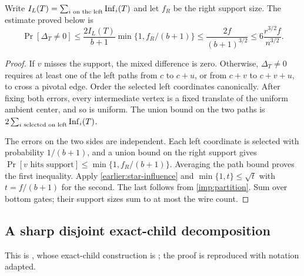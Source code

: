 Write $I_L(T)=\sum_{i\text{ on the left}}\operatorname{Inf}_i(T)$ and let $f_R$
be the right support size. The estimate proved below is
\[
\Pr[\Delta_T\ne0]\le
\frac{2I_L(T)}{b+1}\min\{1,f_R/(b+1)\}
\le\frac{2f}{(b+1)^{3/2}}
\le6\frac{r^{3/2}f}{n^{3/2}}.
\]
\begin{proof}
If $v$ misses the support, the mixed difference is zero. Otherwise,
$\Delta_T\ne0$ requires at least one of the left paths from $c$ to
$c+u$, or from $c+v$ to $c+v+u$, to cross a pivotal edge. Order the
selected left coordinates canonically. After fixing both errors, every
intermediate vertex is a fixed translate of the uniform ambient center,
and so is uniform. The union bound on the two paths is
$2\sum_{i\text{ selected on left}}\operatorname{Inf}_i(T)$.

The errors on the two sides are independent. Each left coordinate is
selected with probability $1/(b+1)$, and a union bound on the right
support gives $\Pr[v\text{ hits support}]\le
\min\{1,f_R/(b+1)\}$. Averaging the path bound proves the first
inequality. Apply \cref{earlier:star-influence} and
$\min\{1,t\}\le\sqrt t$ with $t=f/(b+1)$ for the second.
The last follows from \cref{imp:partition}. Sum over bottom gates;
their support sizes sum to at most the wire count.
\end{proof}

\subsection{A sharp disjoint exact-child decomposition}
\label{earlier:imp:disjoint}
This is \cite[Lemma~C.2]{Nag72}, whose exact-child construction is \cite[Lemma~A.4]{NagCubic}; the proof is reproduced with notation adapted.


